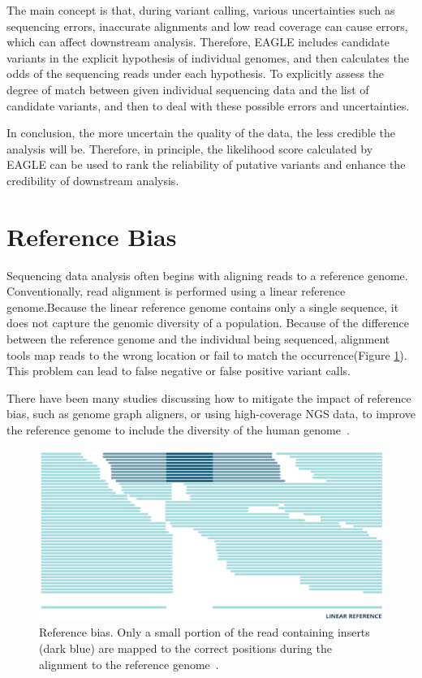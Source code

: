 \documentclass[PhD]{PHlab-thesis}
\begin{document}
The main concept is that, during variant calling, various uncertainties such as sequencing errors, inaccurate alignments and low read coverage can cause errors, which can affect downstream analysis. Therefore, EAGLE includes candidate variants in the explicit hypothesis of individual genomes, and then calculates the odds of the sequencing reads under each hypothesis. To explicitly assess the degree of match between given individual sequencing data and the list of candidate variants, and then to deal with these possible errors and uncertainties.

In conclusion, the more uncertain the quality of the data, the less credible the analysis will be. Therefore, in principle, the likelihood score calculated by EAGLE can be used to rank the reliability of putative variants and enhance the credibility of downstream analysis.

\section{Reference Bias}
Sequencing data analysis often begins with aligning reads to a reference genome. Conventionally, read alignment is performed using a linear reference genome.Because the linear reference genome contains only a single sequence, it does not capture the genomic diversity of a population. Because of the difference between the reference genome and the individual being sequenced, alignment tools map reads to the wrong location or fail to match the occurrence(Figure \ref{fig:Reference bias}). This problem can lead to false negative or false positive variant calls.

There have been many studies discussing how to mitigate the impact of reference bias, such as genome graph aligners, or using high-coverage NGS data, to improve the reference genome to include the diversity of the human genome~\cite{Günther2019Refbias, Chen2021Refbias}.

\begin{figure}[h!]
	\centering
	\includegraphics[scale=0.25]{figures/Reference bias.png}
	\caption{Reference bias. Only a small portion of the read containing inserts (dark blue) are mapped to the correct positions during the alignment to the reference genome~\cite{Lau2017Refbias}.}
	\label{fig:Reference bias} %
\end{figure}
\end{document}
